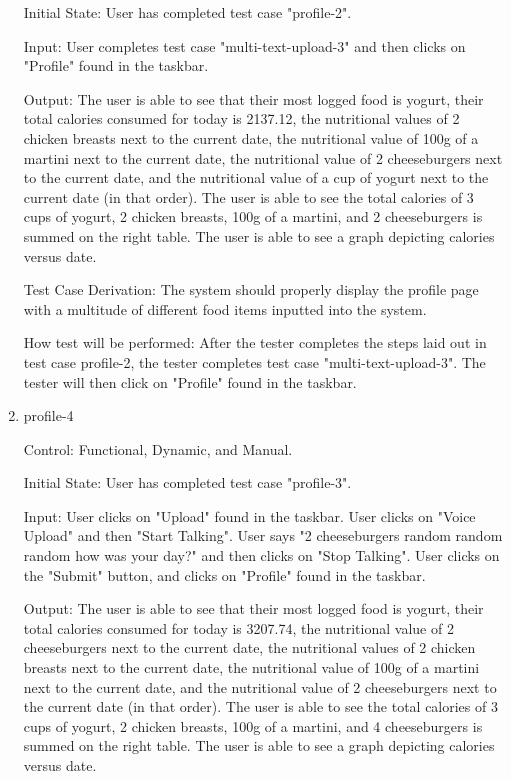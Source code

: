 \documentclass[12pt, titlepage]{article}
\begin{document}
\begin{enumerate}
		Initial State: User has completed test case "profile-2".
		
		Input: User completes test case "multi-text-upload-3" and then clicks on "Profile" found in the taskbar.
		
		Output: The user is able to see that their most logged food is yogurt, their total calories consumed for today is 2137.12, the nutritional values of 2 chicken breasts next to the current date, the nutritional value of 100g of a martini next to the current date, the nutritional value of 2 cheeseburgers next to the current date, and the nutritional value of a cup of yogurt next to the current date (in that order). The user is able to see the total calories of 3 cups of yogurt, 2 chicken breasts, 100g of a martini, and 2 cheeseburgers is summed on the right table. The user is able to see a graph depicting calories versus date.
		
		Test Case Derivation: The system should properly display the profile page with a multitude of different food items inputted into the system.
		
		How test will be performed: After the tester completes the steps laid out in test case profile-2, the tester completes test case "multi-text-upload-3". The tester will then click on "Profile" found in the taskbar.
		
		\item{profile-4\\}
		
		Control: Functional, Dynamic, and Manual.
		
		Initial State: User has completed test case "profile-3".
		
		Input: User clicks on "Upload" found in the taskbar. User clicks on "Voice Upload" and then "Start Talking". User says "2 cheeseburgers random random random how was your day?" and then clicks on "Stop Talking". User clicks on the "Submit" button, and clicks on "Profile" found in the taskbar.
		
		Output: The user is able to see that their most logged food is yogurt, their total calories consumed for today is 3207.74, the nutritional value of 2 cheeseburgers next to the current date, the nutritional values of 2 chicken breasts next to the current date, the nutritional value of 100g of a martini next to the current date, and the nutritional value of 2 cheeseburgers next to the current date (in that order). The user is able to see the total calories of 3 cups of yogurt, 2 chicken breasts, 100g of a martini, and 4 cheeseburgers is summed on the right table. The user is able to see a graph depicting calories versus date.
		

\end{enumerate}
\end{document}
